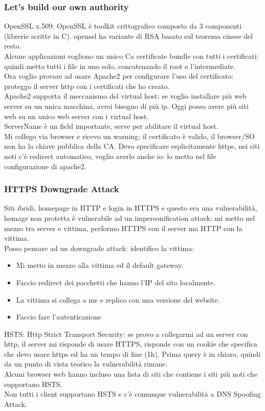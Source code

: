 \documentclass[16px]{article}
\begin{document}
\subsubsection{Let's build our own authority}
OpenSSL x.509: OpenSSL è toolkit crittografico composto da 3 componenti (librerie scritte in C). openssl ha variante di RSA basato sul teorema cinese del resto.\\ Alcune applicazioni vogliono un unico Ca certificate bundle con tutti i certificati: quindi metto tutti i file in uno solo, concatenando il root e l'intermediate.\\Ora voglio provare ad usare Apache2 per configurare l'uso del certificato: proteggo il server http con i certificati che ho creato.\\ Apache2 supporta il meccanismo del virtual host: se voglio installare più web server su un unica macchina, avrei bisogno di più ip. Oggi posso avere più siti web su un unico web server con i virtual host.\\ ServerName è un field importante, serve per abilitare il virtual host.\\ Mi collego via browser e ricevo un warning: il certificato è valido, il browser/SO non ha la chiave pubblica della CA. Devo specificare esplicitamente https, nei siti noti c'è redirect automatico, voglio averlo anche io: lo metto nel file configurazione di apache2.\\
\subsubsection{HTTPS Downgrade Attack}
Siti ibridi, homepage in HTTP e login in HTTPS e questo era una vulnerabilità, homage non protetta è vulnerabile ad un impersonification attack: mi metto nel mezzo tra server e vittima, performo HTTPS con il server ma HTTP con la vittima.\\ Posso pensare ad un downgrade attack: identifico la vittima:
\begin{itemize}
\item Mi metto in mezzo alla vittima ed il default gateway.
\item Faccio redirect dei pacchetti che hanno l'IP del sito localmente.
\item La vittima si collega a me e replico con una versione del website.
\item Faccio fare l'autenticazione
\end{itemize}
HSTS: Http Strict Transport Security: se provo a collegarmi ad un server con http, il server mi risponde di usare HTTPS, risponde con un cookie che specifica che devo usare https ed ha un tempo di fine (1h). Prima query è in chiaro, quindi da un punto di vista teorico la vulnerabilità rimane.\\ Alcuni browser web hanno incluso una lista di siti che contiene i siti più noti che supportano HSTS.\\ Non tutti i client supportano HSTS e c'è comunque vulnerabilità a DNS Spoofing Attack.\\
\end{document}
